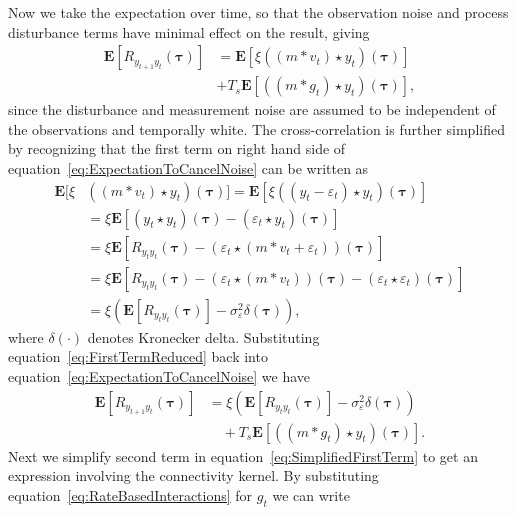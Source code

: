 \documentclass[conference,onecolumn]{IEEEtran}
\begin{document}
Now we take the expectation over time, so that the observation noise and process disturbance terms have minimal effect on the result, giving 
\begin{align}\label{eq:ExpectationToCancelNoise}
	\mathbf{E}[R_{y_{t+1}y_t}(\boldsymbol{\tau})] &= \mathbf{E}[\xi\left(\left(m \ast v_t\right) \star y_t \right)(\boldsymbol{\tau})] \nonumber \\
	 &+ T_s \mathbf{E}[\left(\left(m\ast g_t\right)\star y_t \right)(\boldsymbol{\tau})],
\end{align}
since the disturbance and measurement noise are assumed to be independent of the observations and temporally white. 
The cross-correlation is further simplified by recognizing that the first term on right hand side of equation~\ref{eq:ExpectationToCancelNoise} can be written as 
\begin{align}
	\mathbf{E}[\xi&\left(\left(m \ast v_t \right) \star y_t \right)(\boldsymbol{\tau})] = \mathbf{E}\left[\xi\left(\left(y_t-\varepsilon_t\right) \star y_t \right)(\boldsymbol{\tau})\right] \\
	&= \xi \mathbf{E}\left[ (y_t \star y_t)(\boldsymbol{\tau}) - \left(\varepsilon_t\star y_t \right)(\boldsymbol{\tau})\right] \\
	&= \xi\mathbf{E}[ R_{y_ty_t}(\boldsymbol{\tau})  - \left(\varepsilon_t \star (m\ast v_t + \varepsilon_t)\right) (\boldsymbol{\tau})] \\
	&=\xi\mathbf{E}[ R_{y_ty_t}(\boldsymbol{\tau}) -\left(\varepsilon_t\star (m\ast v_t)\right)(\boldsymbol{\tau}) - (\varepsilon_t\star\varepsilon_t)(\boldsymbol{\tau})] \\
	&= \xi\left(\mathbf{E}[ R_{y_ty_t}(\boldsymbol{\tau})] - \sigma_{\varepsilon}^2 \delta(\boldsymbol{\tau})\right), \label{eq:FirstTermReduced}
\end{align}
where $\delta\left(\cdot\right)$ denotes Kronecker delta. Substituting equation~\ref{eq:FirstTermReduced} back into equation~\ref{eq:ExpectationToCancelNoise} we have
\begin{align}\label{eq:SimplifiedFirstTerm}
	\mathbf{E}[R_{y_{t+1}y_t}(\boldsymbol{\tau})] &= \xi\left(\mathbf{E}[ R_{y_ty_t}(\boldsymbol{\tau})] - \sigma_{\varepsilon}^2 \delta(\boldsymbol{\tau})\right) \nonumber \\
	&\quad+ T_s\mathbf{E}[ \left(\left(m\ast g_t\right)\star y_t \right)(\boldsymbol{\tau})].
\end{align}
Next we simplify second term in equation~\ref{eq:SimplifiedFirstTerm} to get an expression involving the connectivity kernel. By substituting equation~\ref{eq:RateBasedInteractions} for $g_t$ we can write
\end{document}

